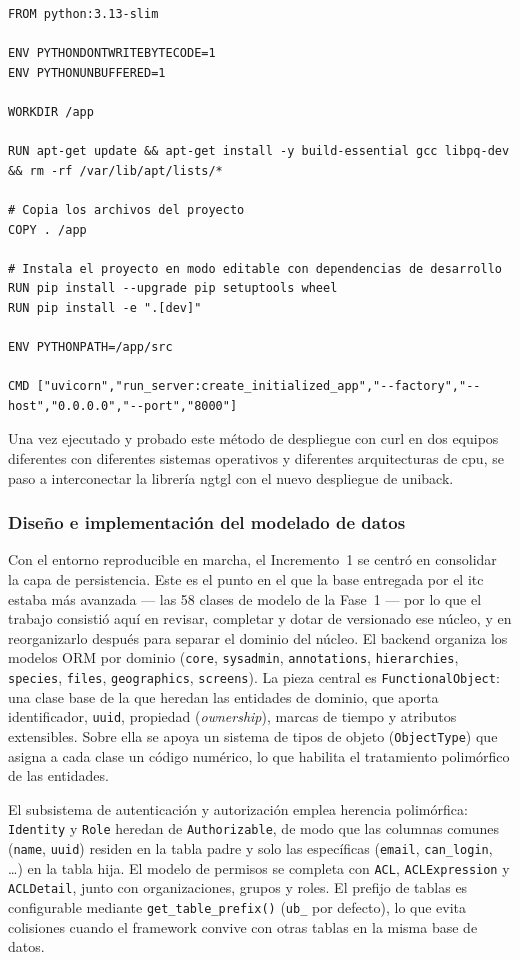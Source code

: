 \begin{lstlisting}[style=docker, caption={Dockerfile de la aplicación UniBack}, label={lst:dockerfile}]
FROM python:3.13-slim

ENV PYTHONDONTWRITEBYTECODE=1
ENV PYTHONUNBUFFERED=1

WORKDIR /app

RUN apt-get update && apt-get install -y build-essential gcc libpq-dev && rm -rf /var/lib/apt/lists/*

# Copia los archivos del proyecto
COPY . /app

# Instala el proyecto en modo editable con dependencias de desarrollo
RUN pip install --upgrade pip setuptools wheel
RUN pip install -e ".[dev]"

ENV PYTHONPATH=/app/src

CMD ["uvicorn","run_server:create_initialized_app","--factory","--host","0.0.0.0","--port","8000"]
\end{lstlisting}

Una vez ejecutado y probado este método de despliegue con \gls{curl} en dos equipos diferentes 
con diferentes sistemas operativos y diferentes arquitecturas de cpu, se 
paso a interconectar la librería \gls{ngtgl} con el nuevo despliegue de uniback.

\subsubsection{Diseño e implementación del modelado de datos}
Con el entorno reproducible en marcha, el Incremento~1 se centró en consolidar
la capa de persistencia. Este es el punto en el que la base entregada por el
\gls{itc} estaba más avanzada --- las 58 clases de modelo de la Fase~1 --- por lo
que el trabajo consistió aquí en revisar, completar y dotar de versionado ese
núcleo, y en reorganizarlo después para separar el dominio del núcleo. El
backend organiza los modelos ORM por dominio
(\texttt{core}, \texttt{sysadmin}, \texttt{annotations},
\texttt{hierarchies}, \texttt{species}, \texttt{files},
\texttt{geographics}, \texttt{screens}). La pieza central es
\texttt{FunctionalObject}: una clase base de la que heredan las entidades de
dominio, que aporta identificador, \texttt{uuid}, propiedad (\emph{ownership}),
marcas de tiempo y atributos extensibles. Sobre ella se apoya un sistema de
tipos de objeto (\texttt{ObjectType}) que asigna a cada clase un código
numérico, lo que habilita el tratamiento polimórfico de las entidades.

El subsistema de autenticación y autorización emplea herencia polimórfica:
\texttt{Identity} y \texttt{Role} heredan de \texttt{Authorizable}, de modo
que las columnas comunes (\texttt{name}, \texttt{uuid}) residen en la tabla
padre y solo las específicas (\texttt{email}, \texttt{can\_login}, \ldots) en
la tabla hija. El modelo de permisos se completa con \texttt{ACL},
\texttt{ACLExpression} y \texttt{ACLDetail}, junto con organizaciones, grupos
y roles. El prefijo de tablas es configurable mediante
\texttt{get\_table\_prefix()} (\texttt{ub\_} por defecto), lo que evita
colisiones cuando el framework convive con otras tablas en la misma base de
datos.

